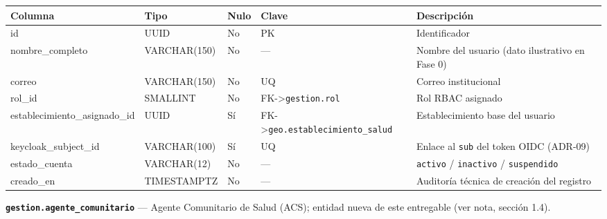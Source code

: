 \documentclass[11pt,a4paper]{article}
\begin{document}
{\small
\begin{longtable}[]{@{}
  >{\raggedright\arraybackslash}p{}
  >{\raggedright\arraybackslash}p{}
  >{\raggedright\arraybackslash}p{}
  >{\raggedright\arraybackslash}p{}
  >{\raggedright\arraybackslash}p{}@{}}
\toprule\noalign{}
\begin{minipage}[b]{\linewidth}\raggedright
Columna
\end{minipage} & \begin{minipage}[b]{\linewidth}\raggedright
Tipo
\end{minipage} & \begin{minipage}[b]{\linewidth}\raggedright
Nulo
\end{minipage} & \begin{minipage}[b]{\linewidth}\raggedright
Clave
\end{minipage} & \begin{minipage}[b]{\linewidth}\raggedright
Descripción
\end{minipage} \\
\midrule\noalign{}
\endhead
\bottomrule\noalign{}
\endlastfoot
id & UUID & No & PK & Identificador \\
nombre\_completo & VARCHAR(150) & No & --- & Nombre del usuario (dato ilustrativo en Fase 0) \\
correo & VARCHAR(150) & No & UQ & Correo institucional \\
rol\_id & SMALLINT & No & FK-\textgreater{}\texttt{gestion.rol} & Rol RBAC asignado \\
establecimiento\_asignado\_id & UUID & Sí & FK-\textgreater{}\texttt{geo.establecimiento\_salud} & Establecimiento base del usuario \\
keycloak\_subject\_id & VARCHAR(100) & Sí & UQ & Enlace al \texttt{sub} del token OIDC (ADR-09) \\
estado\_cuenta & VARCHAR(12) & No & --- & \texttt{activo} / \texttt{inactivo} / \texttt{suspendido} \\
creado\_en & TIMESTAMPTZ & No & --- & Auditoría técnica de creación del registro \\
\end{longtable}
}

\textbf{\texttt{gestion.agente\_comunitario}} --- Agente Comunitario de Salud (ACS); entidad nueva de este entregable (ver nota, sección 1.4).
\end{document}
